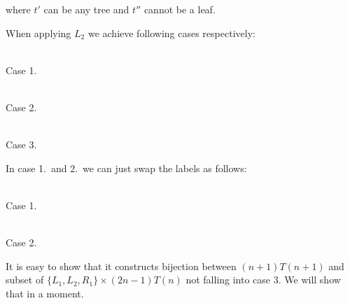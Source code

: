 \documentclass[final]{article}
\theoremstyle{definition}
\theoremstyle{remark}
\begin{document}
where \(t'\) can be any tree and \(t''\) cannot be a leaf.

When applying \(L_2\) we achieve following cases respectively:

\begin{center}
    \begin{minipage}[t]{.3\textwidth}
        \begin{center}
            \\
            Case 1.
        \end{center}
    \end{minipage}%
    \begin{minipage}[t]{.3\textwidth}
        \begin{center}
            \\
            Case 2.
        \end{center}
    \end{minipage}%
    \begin{minipage}[t]{.3\textwidth}
        \begin{center}
            \\
            Case 3.
        \end{center}
    \end{minipage}%
\end{center}

In case 1.\ and 2.\ we can just swap the labels as follows:

\begin{center}
    \begin{minipage}[t]{.3\textwidth}
        \begin{center}
            \\
            Case 1.
        \end{center}
    \end{minipage}%
    \begin{minipage}[t]{.3\textwidth}
        \begin{center}
            \\
            Case 2.
        \end{center}
    \end{minipage}%
\end{center}

It is easy to show that it constructs bijection between \((n + 1) T(n + 1)\) and subset of \(\{L_1, L_2, R_1\} \times (2 n - 1) T(n)\) not falling into case 3. We will show that in a moment.
\end{document}
